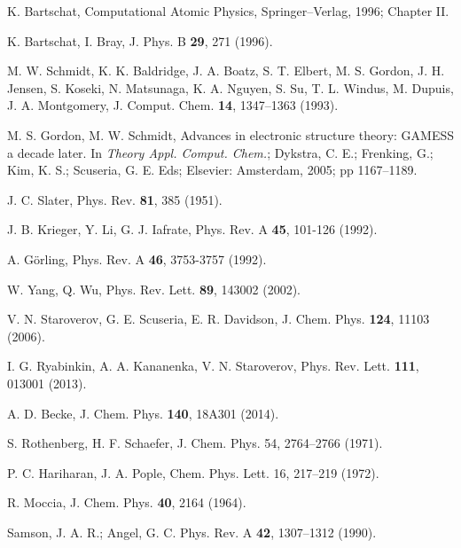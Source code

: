 \begin{thebibliography}{9}
K. Bartschat, 
Computational Atomic Physics,
Springer--Verlag, 1996; Chapter II.

K. Bartschat, I. Bray, 
J. Phys. B \textbf{29}, 271 (1996).


M. W. Schmidt, K. K. Baldridge, J. A. Boatz, S. T. Elbert, M. S. Gordon, 
J. H. Jensen, S. Koseki, N. Matsunaga, K. A. Nguyen, S. Su, T. L. Windus, 
M. Dupuis, J. A. Montgomery, 
J. Comput. Chem. \textbf{14}, 1347--1363 (1993).

M. S. Gordon, M. W. Schmidt, 
Advances in electronic structure theory: GAMESS a decade later. 
In \textit{Theory Appl. Comput. Chem.}; 
Dykstra, C. E.; Frenking, G.; Kim, K. S.; Scuseria, G. E. Eds;
Elsevier: Amsterdam, 2005; pp 1167--1189.


J. C. Slater, 
Phys. Rev. \textbf{81}, 385 (1951).

J. B. Krieger, Y. Li, G. J. Iafrate, 
Phys. Rev. A \textbf{45}, 101-126 (1992).

A. G\"orling,
Phys. Rev. A \textbf{46}, 3753-3757 (1992).

W. Yang, Q. Wu,
Phys. Rev. Lett. \textbf{89}, 143002 (2002).

V. N. Staroverov, G. E. Scuseria, E. R. Davidson,
J. Chem. Phys. \textbf{124}, 11103 (2006).

I. G. Ryabinkin, A. A. Kananenka, V. N. Staroverov,
Phys. Rev. Lett. \textbf{111}, 013001 (2013).

A. D. Becke,
J. Chem. Phys. \textbf{140}, 18A301 (2014).


S. Rothenberg, H. F. Schaefer, 
J. Chem. Phys. 54, 2764--2766 (1971).

P. C. Hariharan, J. A. Pople, 
Chem. Phys. Lett. 16, 217--219 (1972).

R. Moccia, 
J. Chem. Phys. \textbf{40}, 2164 (1964).


Samson, J. A. R.; Angel, G. C.
Phys. Rev. A \textbf{42}, 1307--1312 (1990).


\end{thebibliography}
